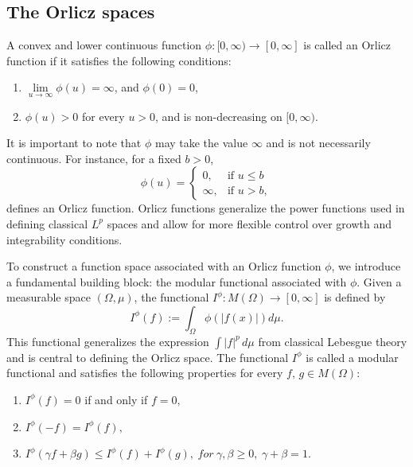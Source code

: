 \documentclass[11pt, a4paper]{article}
\theoremstyle{definition}
\numberwithin{equation}{section}
\begin{document}
\subsection{The Orlicz spaces}\label{s2.3}
A convex and lower continuous function $\phi:[0,\infty)\to [0,\infty]$ is called an Orlicz function if it satisfies the following conditions: 
\begin{enumerate}[label=(\roman*), left=0pt]\label{2.3}
    \item  $\lim\limits_{u\to \infty} \phi(u)=\infty$, and  $\phi(0)=0$,
			
    \item $\phi(u)>0$ for  every $u>0$, and is non-decreasing on $[0,\infty)$.
\end{enumerate}
It is important to note that \(\phi\) may take the value \(\infty\) and is not necessarily continuous. For instance, for a fixed \( b > 0 \),
\[	\phi(u) = 
\begin{cases} 
    0, & \text{if } u \leq b \\
    \infty, & \text{if } u > b,
\end{cases}\]
defines an Orlicz function. Orlicz functions generalize the power functions used in defining classical $L^p$ spaces and allow for more flexible control over growth and integrability conditions.
\par 
To construct a function space associated with an Orlicz function $\phi$, we introduce a fundamental building block: the modular functional associated with $\phi$. 
 Given a measurable space $(\Omega, \mu)$, 
the functional $I^{\phi}: M(\Omega) \rightarrow [0,\infty]$ is defined by 
\begin{equation*} 
    I^{\phi}(f):=\int_{\Omega} \phi(|f(x)|) d\mu .
\end{equation*}
This functional generalizes the expression $\int |f|^p\,d\mu$ from classical Lebesgue theory and is central to defining the Orlicz space.
The functional $I^{\phi}$ is called a modular functional and satisfies the following properties for every $f,\,g \in  M(\Omega) :$
\begin{enumerate}[label=(\roman*)]
    \item $I^{\phi}(f)=0$ if and only if $f=0,$
    \item $I^{\phi}(-f)=I^{\phi}(f),$
    \item $I^{\phi}(\gamma f +\beta g) \leq I^{\phi}(f)+I^{\phi}(g) , \hspace{3pt}for\hspace{3pt} \gamma,\beta \geq 0, \hspace{3pt} \gamma +\beta =1.$
\end{enumerate}
\end{document}
